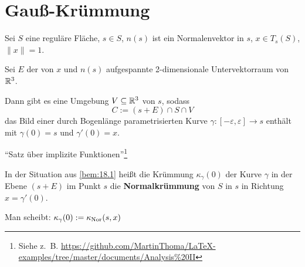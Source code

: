 \section{Gauß-Krümmung}
\begin{bemerkung}\label{bem:18.1}%
    Sei $S$ eine reguläre Fläche, $s \in S$, $n(s)$ ist ein Normalenvektor
    in $s$, $x \in T_s (S)$, $\|x\| = 1$.

    Sei $E$ der von $x$ und $n(s)$ aufgespannte 2-dimensionale 
    Untervektorraum von $\mathbb{R}^3$.

    Dann gibt es eine Umgebung $V \subseteq \mathbb{R}^3$ von $s$, sodass
    \[C := (s + E) \cap S \cap V\]
    das Bild einer durch Bogenlänge parametrisierten Kurve
    $\gamma:[-\varepsilon, \varepsilon] \rightarrow s$ enthält mit
    $\gamma(0) = s$ und $\gamma'(0) = x$.
\end{bemerkung}

\begin{beweis}
    \enquote{Satz über implizite Funktionen}\footnote{Siehe z.~B. 
    \url{https://github.com/MartinThoma/LaTeX-examples/tree/master/documents/Analysis\%20II}}
\end{beweis}

\begin{definition}%
    In der Situation aus \cref{bem:18.1} heißt die Krümmung $\kappa_\gamma(0)$
    der Kurve $\gamma$ in der Ebene $(s+ E)$ im Punkt $s$ die
    \textbf{Normalkrümmung}\footnotemark{} von $S$ in $s$ in Richtung
    $x = \gamma'(0)$.

    Man scheibt: $\kappa_\gamma(0) := \kappa_{\textnormal{Nor}}(s, x)$
\end{definition}

